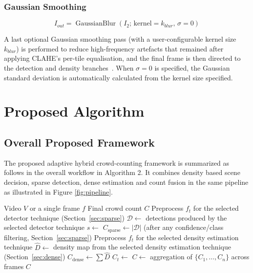 \subsubsection{Gaussian Smoothing}

\begin{equation}
	I_{out} =
	\operatorname{GaussianBlur}\left(
	I_{2};\,\text{kernel}=k_{blur},\,\sigma=0
	\right)
	\label{eq:gaussian-blur}
\end{equation}

A last optional Gaussian smoothing pass (with a user-configurable kernel size $k_{blur}$) is performed to reduce high-frequency artefacts that remained after applying CLAHE's per-tile equalisation, and the final frame is then directed to the detection and density branches~\cite{gonzalez2018digital}. When $\sigma = 0$ is specified, the Gaussian standard deviation is automatically calculated from the kernel size specified.

\section{Proposed Algorithm}
\label{sec:proposed-algorithm}

\subsection{Overall Proposed Framework}

The proposed adaptive hybrid crowd-counting framework is summarized as follows in the overall workflow in Algorithm 2. It combines density based scene decision, sparse detection, dense estimation and count fusion in the same pipeline as illustrated in Figure \ref{fig:pipeline}.

\begin{algorithm}[H]
	\caption{Adaptive Hybrid Crowd Counting}
	\label{alg:overall}
	\begin{algorithmic}[1]
		\Require Video $V$ or a single frame $f$
		\Ensure Final crowd count $C$
		\State Preprocess $f_t$ for the selected detector technique (Section~\ref{sec:sparse})
		\State $\mathcal{D} \gets$ detections produced by the selected detector technique
		\State $s \gets$  
		\State $C_{\text{sparse}} \gets |\mathcal{D}|$ (after any confidence/class filtering, Section~\ref{sec:sparse})
		\State Preprocess $f_t$ for the selected density estimation technique
		\State $\hat D \gets$ density map from the selected density estimation technique (Section~\ref{sec:dense})
		\State $C_{\text{dense}} \gets \sum \hat D$ 
		\State $C_t \gets$  
		\EndFor
		\State $C \gets$ aggregation of $\{C_1,\dots,C_n\}$ across frames 
		\State \Return $C$
	\end{algorithmic}
\end{algorithm}

